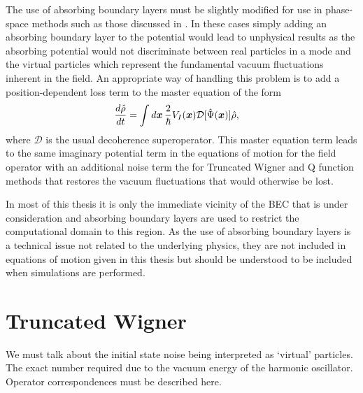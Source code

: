 The use of absorbing boundary layers must be slightly modified for use in phase-space methods such as those discussed in . In these cases simply adding an absorbing boundary layer to the potential would lead to unphysical results as the absorbing potential would not discriminate between real particles in a mode and the virtual particles which represent the fundamental vacuum fluctuations inherent in the field. An appropriate way of handling this problem is to add a position-dependent loss term to the master equation of the form
\begin{align}
    \label{BackgroundTheory:PhaseSpaceAbsorbingBoundaryLayer}
    \frac{d \hat{\rho}}{dt} &= \int d \vect{x}\, \frac{2}{\hbar}V_I(\vect{x})\mathcal{D}[\hat{\Psi}(\vect{x})]\hat{\rho},
\end{align}
where $\mathcal{D}$ is the usual decoherence superoperator. This master equation term leads to the same imaginary potential term in the equations of motion for the field operator with an additional noise term the for Truncated Wigner and Q function methods that restores the vacuum fluctuations that would otherwise be lost.

\parasep

In most of this thesis it is only the immediate vicinity of the BEC that is under consideration and absorbing boundary layers are used to restrict the computational domain to this region.  As the use of absorbing boundary layers is a technical issue not related to the underlying physics, they are not included in equations of motion given in this thesis but should be understood to be included when simulations are performed.  


\section{Truncated Wigner}
\label{BackgroundTheory:TruncatedWigner}
We must talk about the initial state noise being interpreted as `virtual' particles. The exact number required due to the vacuum energy of the harmonic oscillator.
Operator correspondences must be described here.
